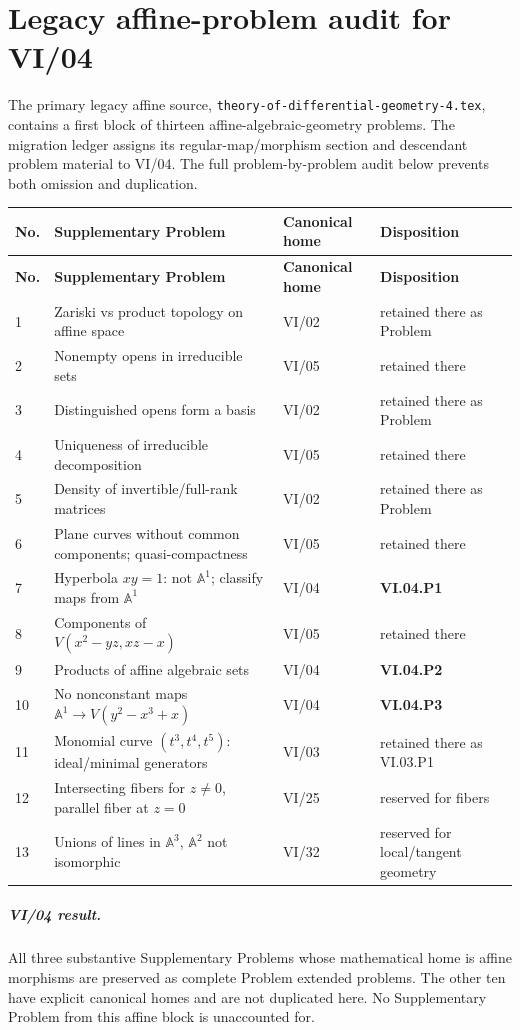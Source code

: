 \chapter*{Legacy affine-problem audit for VI/04}

The primary legacy affine source, \texttt{theory-of-differential-geometry-4.tex}, contains a
first block of thirteen affine-algebraic-geometry problems.  The migration ledger assigns
its regular-map/morphism section and descendant problem material to VI/04.  The full
problem-by-problem audit below prevents both omission and duplication.

\begin{longtable}{@{}p{}p{}p{}p{}@{}}
\toprule
\textbf{No.} & \textbf{Supplementary Problem} & \textbf{Canonical home} & \textbf{Disposition}\\
\midrule
\endfirsthead
\toprule
\textbf{No.} & \textbf{Supplementary Problem} & \textbf{Canonical home} & \textbf{Disposition}\\
\midrule
\endhead
1 & Zariski vs product topology on affine space & VI/02 & retained there as Problem\\
2 & Nonempty opens in irreducible sets & VI/05 & retained there\\
3 & Distinguished opens form a basis & VI/02 & retained there as Problem\\
4 & Uniqueness of irreducible decomposition & VI/05 & retained there\\
5 & Density of invertible/full-rank matrices & VI/02 & retained there as Problem\\
6 & Plane curves without common components; quasi-compactness & VI/05 & retained there\\
7 & Hyperbola \(xy=1\): not \(\mathbb A^1\); classify maps from \(\mathbb A^1\) & VI/04 & \textbf{VI.04.P1}\\
8 & Components of \(V(x^2-yz,xz-x)\) & VI/05 & retained there\\
9 & Products of affine algebraic sets & VI/04 & \textbf{VI.04.P2}\\
10 & No nonconstant maps \(\mathbb A^1\to V(y^2-x^3+x)\) & VI/04 & \textbf{VI.04.P3}\\
11 & Monomial curve \((t^3,t^4,t^5)\): ideal/minimal generators & VI/03 & retained there as VI.03.P1\\
12 & Intersecting fibers for \(z\neq0\), parallel fiber at \(z=0\) & VI/25 & reserved for fibers\\
13 & Unions of lines in \(\mathbb A^3\), \(\mathbb A^2\) not isomorphic & VI/32 & reserved for local/tangent geometry\\
\bottomrule
\end{longtable}

\paragraph{VI/04 result.}
All three substantive Supplementary Problems whose mathematical home is affine morphisms are
preserved as complete Problem extended problems.  The other ten have explicit canonical homes and
are not duplicated here.  No Supplementary Problem from this affine block is unaccounted for.
